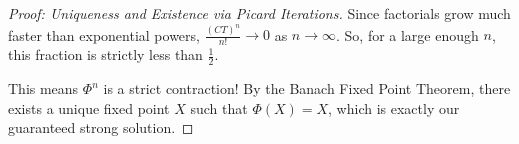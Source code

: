 \begin{proof}[Proof: Uniqueness and Existence via Picard Iterations]
    Since factorials grow much faster than exponential powers, $\frac{(CT)^n}{n!} \to 0$ as $n \to \infty$. So, for a large enough $n$, this fraction is strictly less than $\frac{1}{2}$. 
    
    This means $\Phi^n$ is a strict contraction! By the Banach Fixed Point Theorem, there exists a unique fixed point $X$ such that $\Phi(X) = X$, which is exactly our guaranteed strong solution.
\end{proof}